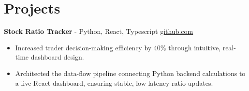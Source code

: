 \documentclass[11pt]{article}       %
\begin{document}

\vspace{-18.5pt}

\section*{Projects}

\textbf{Stock Ratio Tracker}{ - Python, React, Typescript} \hfill \href{https://github.com/Monica20030707/tradingDashboard-UI}{github.com} \\
\vspace{-9pt}
\begin{itemize}
  \item Increased trader decision-making efficiency by 40\% through intuitive, real-time dashboard design.
  \item Architected the data-flow pipeline connecting Python backend calculations to a live React dashboard, ensuring stable, low-latency ratio updates. 
\end{itemize}
\end{document}
